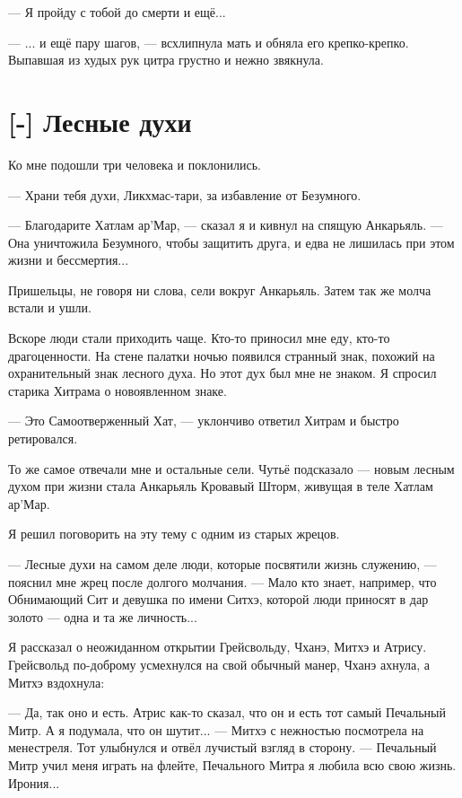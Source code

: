 --- Я пройду с тобой до смерти и ещё...

--- ... и ещё пару шагов, --- всхлипнула мать и обняла его крепко-крепко.
Выпавшая из худых рук цитра грустно и нежно звякнула.

\section{[-] Лесные духи}

\textspace

Ко мне подошли три человека и поклонились.

--- Храни тебя духи, Ликхмас-тари, за избавление от Безумного.

--- Благодарите Хатлам ар’Мар, --- сказал я и кивнул на спящую Анкарьяль.
--- Она уничтожила Безумного, чтобы защитить друга, и едва не лишилась при этом жизни и бессмертия...

Пришельцы, не говоря ни слова, сели вокруг Анкарьяль.
Затем так же молча встали и ушли.

Вскоре люди стали приходить чаще.
Кто-то приносил мне еду, кто-то драгоценности.
На стене палатки ночью появился странный знак, похожий на охранительный знак лесного духа.
Но этот дух был мне не знаком.
Я спросил старика Хитрама о новоявленном знаке.

--- Это Самоотверженный Хат, --- уклончиво ответил Хитрам и быстро ретировался.

То же самое отвечали мне и остальные сели.
Чутьё подсказало --- новым лесным духом при жизни стала Анкарьяль Кровавый Шторм, живущая в теле Хатлам ар’Мар.

Я решил поговорить на эту тему с одним из старых жрецов.

--- Лесные духи на самом деле люди, которые посвятили жизнь служению, --- пояснил мне жрец после долгого молчания.
--- Мало кто знает, например, что Обнимающий Сит и девушка по имени Ситхэ, которой люди приносят в дар золото --- одна и та же личность...

Я рассказал о неожиданном открытии Грейсвольду, Чханэ, Митхэ и Атрису.
Грейсвольд по-доброму усмехнулся на свой обычный манер, Чханэ ахнула, а Митхэ вздохнула:

--- Да, так оно и есть.
Атрис как-то сказал, что он и есть тот самый Печальный Митр.
А я подумала, что он шутит... --- Митхэ с нежностью посмотрела на менестреля.
Тот улыбнулся и отвёл лучистый взгляд в сторону.
--- Печальный Митр учил меня играть на флейте, Печального Митра я любила всю свою жизнь.
Ирония...

